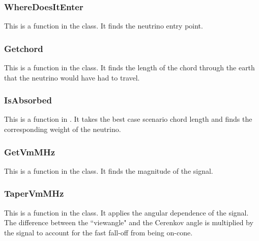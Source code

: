 \subsubsection{WhereDoesItEnter}

This is a function in the  class. 
It finds the neutrino entry point. 

\subsubsection{Getchord}

This is a function in the  class. It finds the length of the chord through the earth that the neutrino would have had to travel. 

\subsubsection{IsAbsorbed}

This is a function in . 
It takes the best case scenario chord length and finds the corresponding weight of the neutrino. 

\subsubsection{GetVmMHz}

This is a function in the  class. 
It finds the magnitude of the signal. 

\subsubsection{TaperVmMHz}

This is a function in the  class. 
It applies the angular dependence of the signal. The difference between the ``viewangle" and the Cerenkov angle is multiplied by the signal to account for the fast fall-off from being on-cone. 


